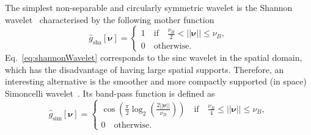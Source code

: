 \documentclass[fleqn,a4paper,oneside,openany]{book}
\begin{document}
The simplest non-separable and circularly symmetric wavelet is the Shannon wavelet~\cite{UCV2011} characterised by the following mother function
%
\begin{equation}\label{eq:shannonWavelet}
\hat{g}_{\text{sha}}[\boldsymbol{\nu}]=
\begin{cases}
1\quad\text{if}\quad\frac{\nu_B}{2}< ||\boldsymbol{\nu}|| \leq \nu_B,\\
0\quad\text{otherwise}.
\end{cases}
\end{equation}
%
Eq.~\eqref{eq:shannonWavelet} corresponds to the sinc wavelet in the spatial domain, which has the disadvantage of having large spatial supports. Therefore, an interesting alternative is the smoother and more compactly supported (in space) Simoncelli wavelet~\cite{PoS2000}. Its band-pass function is defined as
%
\begin{equation}\label{eq:simoncelliWavelet}
\hat{g}_{\text{sim}}[\boldsymbol{\nu}]=
\begin{cases}
\cos\left(\frac{\pi}{2}\log_2\left(\frac{2||\boldsymbol{\nu}||}{\nu_B}\right)\right)\quad\text{if}\quad\frac{\nu_B}{4}\leq ||\boldsymbol{\nu}|| \leq \nu_B,\\
0\quad\text{otherwise}.
\end{cases}
\end{equation}
%
\end{document}
